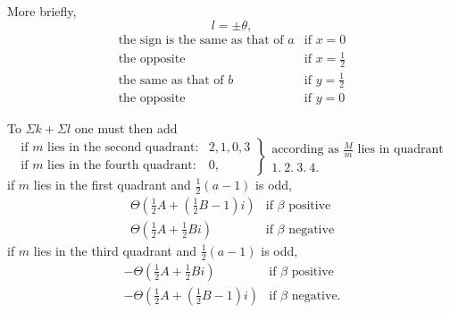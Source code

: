 More briefly,
\[
l=\pm\theta,
\]
\[
\begin{array}{ll}
\text{the sign is the same as that of }a&\text{if }x=0\\
\text{the opposite}&\text{if }x=\frac12\\
\text{the same as that of }b&\text{if }y=\frac12\\
\text{the opposite}&\text{if }y=0
\end{array}
\]

To $\Sigma k+\Sigma l$ one must then add
\begingroup\setlength{\arraycolsep}{1pt}
\[
\left.\begin{array}{ll}
\text{if }m\text{ lies in the second quadrant:}&2,1,0,3\\
\text{if }m\text{ lies in the fourth quadrant:}&0,
\end{array}\right\}
\begin{array}{l}\text{according as }\frac{M}{m}\text{ lies in quadrant}\\1.\ 2.\ 3.\ 4.\text{}\end{array}
\]\endgroup
if $m$ lies in the first quadrant and $\frac12(a-1)$ is odd,
\[
\begin{array}{ll}
\Theta(\frac12A+(\frac12B-1)i)&\text{if }\beta\text{ positive}\\
\Theta(\frac12A+\frac12Bi)&\text{if }\beta\text{ negative}
\end{array}
\]
if $m$ lies in the third quadrant and $\frac12(a-1)$ is odd,
\[
\begin{array}{ll}
-\Theta(\frac12A+\frac12Bi)&\text{if }\beta\text{ positive}\\
-\Theta(\frac12A+(\frac12B-1)i)&\text{if }\beta\text{ negative.}
\end{array}
\]
